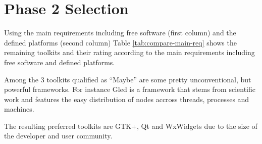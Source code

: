 \section{Phase 2 Selection}

Using the main requirements including free software (first column) and the
defined platforms (second column) Table \ref{tab:compare-main-req} shows the
remaining toolkits and their rating according to the main requirements
including free software and defined platforms.

Among the 3 toolkits qualified as ``Maybe'' are some pretty unconventional, but
powerful frameworks. For instance Gled is a framework that stems from
scientific work and features the easy distribution of nodes accross threads,
processes and machines.

The resulting preferred toolkits are GTK+, Qt and WxWidgets due to the size of
the developer and user community. 

